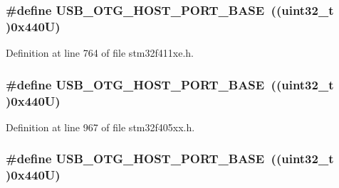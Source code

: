 \subsubsection[{\texorpdfstring{U\+S\+B\+\_\+\+O\+T\+G\+\_\+\+H\+O\+S\+T\+\_\+\+P\+O\+R\+T\+\_\+\+B\+A\+SE}{USB_OTG_HOST_PORT_BASE}}]{\setlength{\rightskip}{0pt plus 5cm}\#define U\+S\+B\+\_\+\+O\+T\+G\+\_\+\+H\+O\+S\+T\+\_\+\+P\+O\+R\+T\+\_\+\+B\+A\+SE~((uint32\+\_\+t )0x440\+U)}\hypertarget{group___peripheral__registers__structures_ga42f433cb79ca69f09972e690fda6737a}{}\label{group___peripheral__registers__structures_ga42f433cb79ca69f09972e690fda6737a}


Definition at line 764 of file stm32f411xe.\+h.

\subsubsection[{\texorpdfstring{U\+S\+B\+\_\+\+O\+T\+G\+\_\+\+H\+O\+S\+T\+\_\+\+P\+O\+R\+T\+\_\+\+B\+A\+SE}{USB_OTG_HOST_PORT_BASE}}]{\setlength{\rightskip}{0pt plus 5cm}\#define U\+S\+B\+\_\+\+O\+T\+G\+\_\+\+H\+O\+S\+T\+\_\+\+P\+O\+R\+T\+\_\+\+B\+A\+SE~((uint32\+\_\+t )0x440\+U)}\hypertarget{group___peripheral__registers__structures_ga42f433cb79ca69f09972e690fda6737a}{}\label{group___peripheral__registers__structures_ga42f433cb79ca69f09972e690fda6737a}


Definition at line 967 of file stm32f405xx.\+h.

\subsubsection[{\texorpdfstring{U\+S\+B\+\_\+\+O\+T\+G\+\_\+\+H\+O\+S\+T\+\_\+\+P\+O\+R\+T\+\_\+\+B\+A\+SE}{USB_OTG_HOST_PORT_BASE}}]{\setlength{\rightskip}{0pt plus 5cm}\#define U\+S\+B\+\_\+\+O\+T\+G\+\_\+\+H\+O\+S\+T\+\_\+\+P\+O\+R\+T\+\_\+\+B\+A\+SE~((uint32\+\_\+t )0x440\+U)}\hypertarget{group___peripheral__registers__structures_ga42f433cb79ca69f09972e690fda6737a}{}\label{group___peripheral__registers__structures_ga42f433cb79ca69f09972e690fda6737a}


